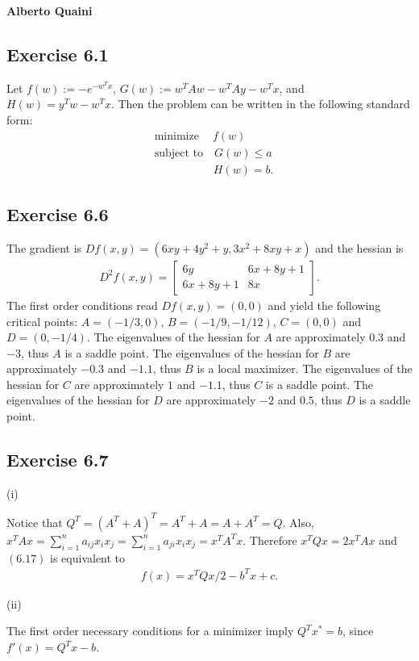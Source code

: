 \documentclass[11.5pt, letterpaper, bibtotoc,
    tablecaptionabove, figurecaptionabove]{article}
\begin{document}
\textbf{Alberto Quaini}

\subsection*{Exercise 6.1}
Let $f(w):=-e^{-w^Tx}$, $G(w):=w^TAw - w^TAy - w^Tx$,
and $H(w)=y^Tw-w^Tx$. 
Then the problem can be written in the following standard form:
\begin{align*}
    &\text{minimize}\quad\ f(w)\\
    &\text{subject to}\quad G(w)\leq a\\
    &\qquad \quad \quad \quad\ H(w)=b.
\end{align*}

\subsection*{Exercise 6.6}
The gradient is $Df(x,y)=(6xy+4y^2+y, 3x^2+8xy+x)$ and the hessian is
\begin{align*}
    D^2f(x,y) = 
    \begin{bmatrix}
        6y & 6x+8y+1\\ 6x+8y+1 & 8x
    \end{bmatrix}.
\end{align*}
The first order conditions read $Df(x,y)=(0,0)$ and yield the following critical points:
$A=(-1/3,0)$, $B=(-1/9, -1/12)$, $C=(0,0)$ and $D=(0,-1/4)$.
The eigenvalues of the hessian for $A$ are approximately $0.3$ and $-3$, thus $A$ is a saddle point.
The eigenvalues of the hessian for $B$ are approximately $-0.3$ and $-1.1$, thus $B$ is a local maximizer.
The eigenvalues of the hessian for $C$ are approximately $1$ and $-1.1$, thus $C$ is a saddle point.
The eigenvalues of the hessian for $D$ are approximately $-2$ and $0.5$, thus $D$ is a saddle point.

\subsection*{Exercise 6.7}
(i)

Notice that $Q^T = (A^T + A)^T = A^T+ A = A + A^T = Q$.
Also, $x^TAx = \sum_{i=1}^na_{ij}x_ix_j = \sum_{i=1}^na_{ji}x_ix_j = x^TA^Tx$.
Therefore $x^TQx = 2x^TAx$ and $(6.17)$ is equivalent to
\begin{align*}
    f(x) = x^TQx/2 - b^Tx +c.
\end{align*}

(ii)

The first order necessary conditions for a minimizer imply
$Q^Tx^* = b$, since $f'(x) = Q^Tx-b$.
\end{document}
